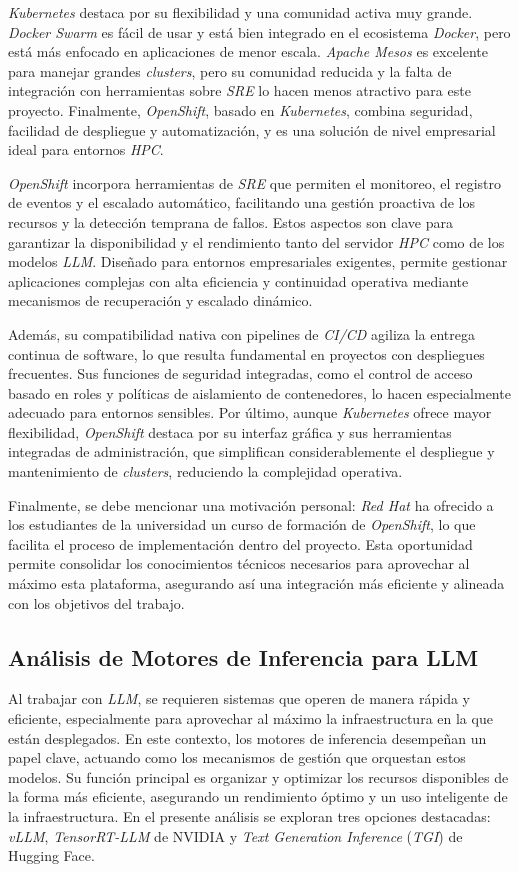 \textit{Kubernetes} destaca por su flexibilidad y una comunidad activa muy grande. \textit{Docker Swarm} es fácil de usar y está bien integrado en el ecosistema \textit{Docker}, pero está más enfocado en aplicaciones de menor escala. \textit{Apache Mesos} es excelente para manejar grandes \textit{clusters}, pero su comunidad reducida y la falta de integración con herramientas sobre \textit{SRE} lo hacen menos atractivo para este proyecto. Finalmente, \textit{OpenShift}, basado en \textit{Kubernetes}, combina seguridad, facilidad de despliegue y automatización, y es una solución de nivel empresarial ideal para entornos \textit{HPC}.

\textit{OpenShift} incorpora herramientas de \textit{SRE} que permiten el monitoreo, el registro de eventos y el escalado automático, facilitando una gestión proactiva de los recursos y la detección temprana de fallos. Estos aspectos son clave para garantizar la disponibilidad y el rendimiento tanto del servidor \textit{HPC} como de los modelos \textit{LLM}. Diseñado para entornos empresariales exigentes, permite gestionar aplicaciones complejas con alta eficiencia y continuidad operativa mediante mecanismos de recuperación y escalado dinámico.

Además, su compatibilidad nativa con pipelines de \textit{CI/CD} agiliza la entrega continua de software, lo que resulta fundamental en proyectos con despliegues frecuentes. Sus funciones de seguridad integradas, como el control de acceso basado en roles y políticas de aislamiento de contenedores, lo hacen especialmente adecuado para entornos sensibles. Por último, aunque \textit{Kubernetes} ofrece mayor flexibilidad, \textit{OpenShift} destaca por su interfaz gráfica y sus herramientas integradas de administración, que simplifican considerablemente el despliegue y mantenimiento de \textit{clusters}, reduciendo la complejidad operativa.

Finalmente, se debe mencionar una motivación personal: \textit{Red Hat} ha ofrecido a los estudiantes de la universidad un curso de formación de \textit{OpenShift}, lo que facilita el proceso de implementación dentro del proyecto. Esta oportunidad permite consolidar los conocimientos técnicos necesarios para aprovechar al máximo esta plataforma, asegurando así una integración más eficiente y alineada con los objetivos del trabajo.

\newpage
\subsection{Análisis de Motores de Inferencia para LLM}
Al trabajar con \textit{LLM}, se requieren sistemas que operen de manera rápida y eficiente, especialmente para aprovechar al máximo la infraestructura en la que están desplegados. En este contexto, los motores de inferencia desempeñan un papel clave, actuando como los mecanismos de gestión que orquestan estos modelos. Su función principal es organizar y optimizar los recursos disponibles de la forma más eficiente, asegurando un rendimiento óptimo y un uso inteligente de la infraestructura. En el presente análisis se exploran tres opciones destacadas: \textit{vLLM}, \textit{TensorRT-LLM} de NVIDIA y \textit{Text Generation Inference} (\textit{TGI}) de Hugging Face.

